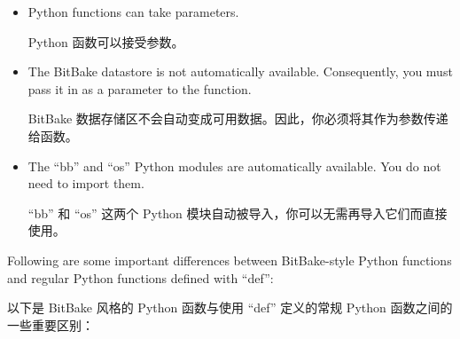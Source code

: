 \begin{itemize}
\setlength\itemsep{1.0em}
\item Python functions can take parameters.

\medskip
Python 函数可以接受参数。

\item The BitBake datastore is not automatically available. Consequently, you must pass it in as a parameter to the function.

\medskip
BitBake 数据存储区不会自动变成可用数据。因此，你必须将其作为参数传递给函数。

\item The ``bb'' and ``os'' Python modules are automatically available. You do not need to import them.

\medskip
``bb'' 和 ``os'' 这两个 Python 模块自动被导入，你可以无需再导入它们而直接使用。

\end{itemize}


Following are some important differences between BitBake-style Python functions and regular Python functions defined with ``def'':

以下是 BitBake 风格的 Python 函数与使用 ``def'' 定义的常规 Python 函数之间的一些重要区别：

